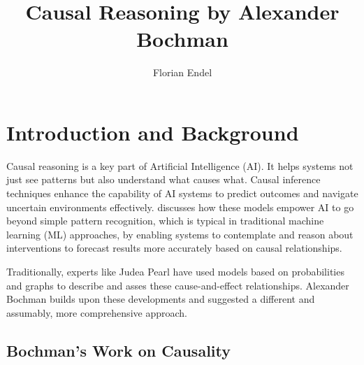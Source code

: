 \documentclass[seminar,palatino,english]{AIGpaper}
\title{Causal Reasoning by Alexander Bochman}
\author{Florian Endel}
\begin{document}
\maketitle %

\section{Introduction and Background}

Causal reasoning is a key part of Artificial Intelligence (AI). It helps systems not just see patterns but also understand what causes what. Causal inference techniques enhance the capability of AI systems to predict outcomes and navigate uncertain environments effectively. \cite{kosaraju_causal_2024} discusses how these models empower AI to go beyond \glqq{}simple\grqq{} pattern recognition, which is typical in traditional machine learning (ML) approaches, by enabling systems to contemplate and reason about interventions to forecast results more accurately based on causal relationships. 

Traditionally, experts like Judea Pearl have used models based on probabilities and graphs to describe and asses these cause-and-effect relationships. Alexander Bochman builds upon these developments and suggested a different and assumably, more comprehensive approach.

\subsection{Bochman's Work on Causality}
\end{document}

